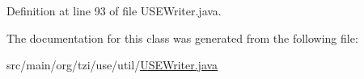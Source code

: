 Definition at line 93 of file U\-S\-E\-Writer.\-java.



The documentation for this class was generated from the following file\-:\begin{DoxyCompactItemize}
\item 
src/main/org/tzi/use/util/\hyperlink{_u_s_e_writer_8java}{U\-S\-E\-Writer.\-java}\end{DoxyCompactItemize}
